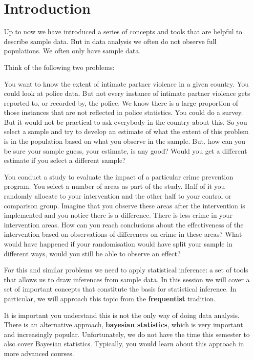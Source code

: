 \documentclass[
]{book}
\begin{document}
\section{Introduction}\label{introduction-2}

Up to now we have introduced a series of concepts and tools that are helpful to describe sample data. But in data analysis we often do not observe full populations. We often only have sample data.

Think of the following two problems:

You want to know the extent of intimate partner violence in a given country. You could look at police data. But not every instance of intimate partner violence gets reported to, or recorded by, the police. We know there is a large proportion of those instances that are not reflected in police statistics. You could do a survey. But it would not be practical to ask everybody in the country about this. So you select a sample and try to develop an estimate of what the extent of this problem is in the population based on what you observe in the sample. But, how can you be sure your sample guess, your estimate, is any good? Would you get a different estimate if you select a different sample?

You conduct a study to evaluate the impact of a particular crime prevention program. You select a number of areas as part of the study. Half of it you randomly allocate to your intervention and the other half to your control or comparison group. Imagine that you observe these areas after the intervention is implemented and you notice there is a difference. There is less crime in your intervention areas. How can you reach conclusions about the effectiveness of the intervention based on observations of differences on crime in these areas? What would have happened if your randomisation would have split your sample in different ways, would you still be able to observe an effect?

For this and similar problems we need to apply statistical inference: a set of tools that allows us to draw inferences from sample data. In this session we will cover a set of important concepts that constitute the basis for statistical inference. In particular, we will approach this topic from the \textbf{frequentist} tradition.

It is important you understand this is not the only way of doing data analysis. There is an alternative approach, \textbf{bayesian statistics}, which is very important and increasingly popular. Unfortunately, we do not have the time this semester to also cover Bayesian statistics. Typically, you would learn about this approach in more advanced courses.
\end{document}
